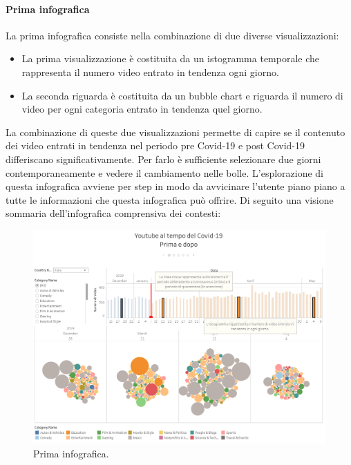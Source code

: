 \documentclass[10pt, a4paper,openany]{article}
\begin{document}
\paragraph{Prima infografica} La prima infografica consiste nella combinazione di due diverse visualizzazioni:
\begin{itemize}
	\item La prima visualizzazione è costituita da un istogramma temporale che rappresenta il numero video entrato in tendenza ogni giorno.
	\item La seconda riguarda è costituita da un bubble chart e riguarda il numero di video per ogni categoria entrato in tendenza quel giorno.
\end{itemize}
La combinazione di queste due visualizzazioni permette di capire se il contenuto dei video entrati in tendenza nel periodo pre Covid-19 e post Covid-19 differiscano significativamente. Per farlo è sufficiente selezionare due giorni contemporaneamente e vedere il cambiamento nelle bolle. L'esplorazione di questa infografica avviene per step in modo da avvicinare l'utente piano piano a tutte le informazioni che questa infografica può offrire. Di seguito una visione sommaria dell'infografica comprensiva dei contesti:
\begin{figure}[H]
	\centering
	\includegraphics[height=0.5 \linewidth]{pics/prima_infografica.png}
	\caption{Prima infografica.}
\end{figure}
\end{document}
